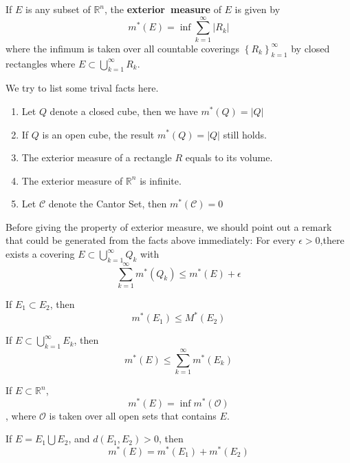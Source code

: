 \documentclass{ctexbook}
\begin{document}
\begin{define}
    If $E$ is any subset of $\mathbb{R}^n$, the \textbf{exterior~measure} of $E$ is given by
    \[m^*(E)=\inf\sum\limits_{k=1}^{\infty}\left|R_k\right|\]
    where the infimum is taken over all countable coverings $\left\{R_k\right\}_{k=1}^{\infty}$ by closed rectangles where 
    $E \subset \bigcup\limits_{k=1}^{\infty}R_k$.
\end{define}

\begin{fact}
    We try to list some trival facts here.
    \begin{enumerate}
        \item Let $Q$ denote a closed cube, then we have $m^*(Q) = \left\lvert Q\right\rvert $
        \item If $Q$ is an open cube, the result $m^*(Q) = \left\lvert Q\right\rvert $ still holds.
        \item The exterior measure of a rectangle $R$ equals to its volume.
        \item The exterior measure of $\mathbb{R}^n$ is infinite.
        \item Let $\mathcal{C} $ denote the Cantor Set, then $m^*(\mathcal{C})=0$
    \end{enumerate}
\end{fact}

Before giving the property of exterior measure, we should point out a remark that could be generated from the facts above
immediately: 
For every $\epsilon>0$,there exists a covering $E \subset \bigcup\limits_{k=1}^{\infty}Q_k$ with
\[\sum\limits_{k=1}^{\infty}m^*(Q_k) \leq m^*(E)+\epsilon\]

\begin{prop}[Monotonicity]
    If $E_1 \subset E_2$, then \[m^*(E_1) \leq M^*(E_2)\]
\end{prop}

\begin{prop}
    If $E \subset \bigcup\limits_{k=1}^{\infty}E_k$, then \[m^*(E) \leq \sum\limits_{k=1}^{\infty}m^*(E_k)\]
\end{prop}

\begin{prop}
    \label{sec exterior measure:open set}
    If $E \subset \mathbb{R}^n$, \[m^*(E) = \inf m^*(\mathcal{O} )\], where $\mathcal{O} $ is taken over all open sets
    that contains $E$.
\end{prop}

\begin{prop}
    If $E=E_1\bigcup E_2$, and $d(E_1,E_2) > 0$, then \[m^*(E) = m^*(E_1)+m^*(E_2)\]
\end{prop}
\end{document}
